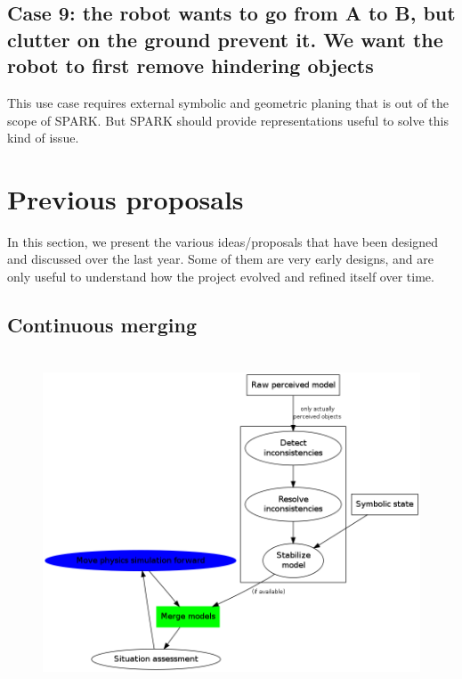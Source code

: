 \documentclass[a4paper]{article}
\begin{document}

\subsection*{
  Case 9: the robot wants to go from A to B, but clutter on the ground prevent it. We want the robot to first remove hindering objects%
  \label{case-9-the-robot-wants-to-go-from-a-to-b-but-clutter-on-the-ground-prevent-it-we-want-the-robot-to-first-remove-hindering-objects}%
}

This use case requires external symbolic and geometric planing that is out of
the scope of SPARK. But SPARK should provide representations useful to solve
this kind of issue.


\section{Previous proposals}

In this section, we present the various ideas/proposals that have been designed
and discussed over the last year. Some of them are very early designs, and are
only useful to understand how the project evolved and refined itself over time.

\subsection{Continuous merging}

\begin{figure}[!h]
    \centering
    \includegraphics[height=10cm]{images/spark_archi0.png}
\end{figure}
\end{document}
